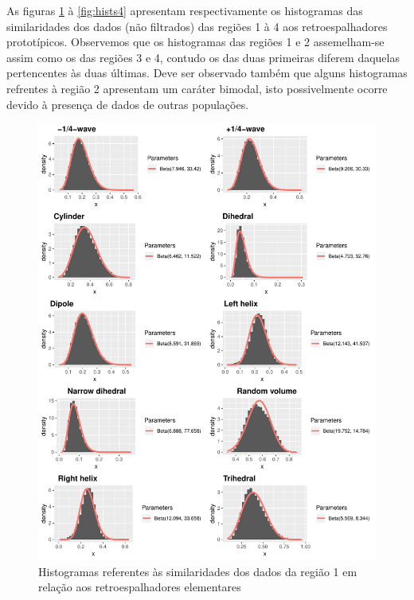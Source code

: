 \documentclass[12pt]{article}
\begin{document}
As figuras \ref{fig:hists1} à \ref{fig:hists4} apresentam respectivamente os histogramas das similaridades dos dados (não filtrados) das regiões 1 à 4 aos retroespalhadores prototípicos. Observemos que os histogramas das regiões 1 e 2 assemelham-se assim como os das regiões 3 e 4, contudo os das duas primeiras diferem daquelas pertencentes às duas últimas. Deve ser observado também que alguns histogramas refrentes à região 2 apresentam um caráter bimodal, isto possivelmente ocorre devido à presença de dados de outras populações.

\begin{figure}[!h]

  \centering
  \includegraphics[width = 0.75\linewidth]{../../Figures/Report_19_02_27/region1_plots.pdf}
  \caption{Histogramas referentes às similaridades dos dados da região 1 em relação aos retroespalhadores elementares}
  \label{fig:hists1}

\end{figure}

\newpage
\end{document}
